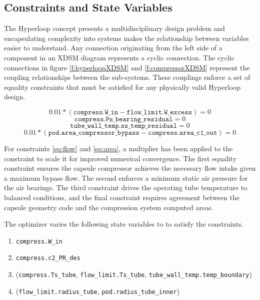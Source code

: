 \documentclass[heading.tex]{subfiles}
\begin{document}
\subsection{Constraints and State Variables}

The Hyperloop concept presents a multidisciplinary design problem and encapsulating complexity into systems makes the relationship
between variables easier to understand.  Any connection originating from the left side of a component in an XDSM diagram represents a
cyclic connection. The cyclic connections in figure \ref{f:hyperloopXDSM}  and \ref{f:compressorXDSM} represent the coupling relationships
between the sub-systems. These couplings enforce a set of equality constraints that must be satisfied for any physically valid Hyperloop design. 

\begin{equation} \label{eq:flow}
	0.01*(\texttt{compress.W\_in} - \texttt{flow\_limit.W\_excess}) = 0
\end{equation}
\begin{equation} \label{eq:bearing}
	\texttt{compress.Ps\_bearing\_residual} = 0
\end{equation}
\begin{equation} \label{eq:temp}
	\texttt{tube\_wall\_temp.ss\_temp\_residual} = 0
\end{equation}
\begin{equation} \label{eq:area}
	0.01*(\texttt{pod.area\_compressor\_bypass} - \texttt{compress.area\_c1\_out}) = 0
\end{equation}

For constraints \ref{eq:flow} and \ref{eq:area}, a multiplier has been applied to the constraint to scale it for improved numerical convergence.
The first equality constraint ensures the capsule compressor achieves the necessary flow intake given a maximum bypass flow.
The second enforces a minimum static air pressure for the air bearings. The third constraint drives the operating tube temperature to balanced conditions,
and the final constraint requires agreement between the capsule geometry code and the compression system computed areas.

The optimizer varies  the following state variables to to satisfy the constraints. 

\begin{enumerate}
\item \texttt{compress.W\_in}
\item \texttt{compress.c2\_PR\_des}
\item (\texttt{compress.Ts\_tube}, \texttt{flow\_limit.Ts\_tube}, \texttt{tube\_wall\_temp.temp\_boundary}) \label{Temp}
\item (\texttt{flow\_limit.radius\_tube}, \texttt{pod.radius\_tube\_inner}) \label{Radius}
\end{enumerate}
\end{document}
